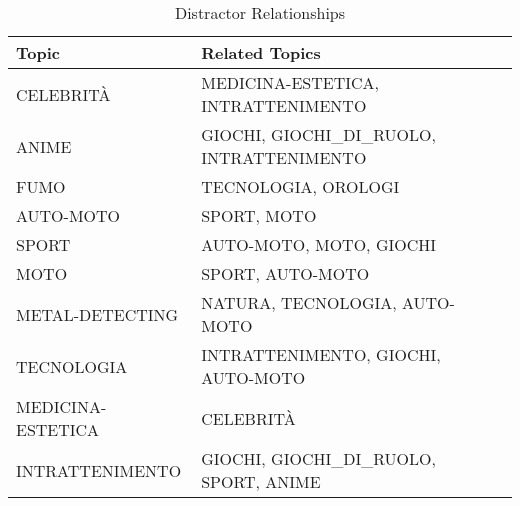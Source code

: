 \documentclass[11pt]{article}
\begin{document}
\begin{table*}
  \centering
  \caption{Distractor Relationships}
  \label{tab:distractor}
  \begin{tabular}{lll}
  \hline
  \textbf{Topic}           & \textbf{Related Topics}                                                                                                                         \\ \hline
  CELEBRITÀ                & MEDICINA-ESTETICA, INTRATTENIMENTO                                                                                                                   \\ \hline
  ANIME                    & GIOCHI, GIOCHI\_DI\_RUOLO, INTRATTENIMENTO                                                                                                           \\ \hline
  FUMO                     & TECNOLOGIA, OROLOGI                                                                                                                                  \\ \hline
  AUTO-MOTO                & SPORT, MOTO                                                                                                                                           \\ \hline
  SPORT                    & AUTO-MOTO, MOTO, GIOCHI                                                                                                                              \\ \hline
  MOTO                     & SPORT, AUTO-MOTO                                                                                                                                      \\ \hline
  METAL-DETECTING          & NATURA, TECNOLOGIA, AUTO-MOTO                                                                                                                         \\ \hline
  TECNOLOGIA               & INTRATTENIMENTO, GIOCHI, AUTO-MOTO                                                                                                                    \\ \hline
  MEDICINA-ESTETICA        & CELEBRITÀ                                                                                                                                             \\ \hline
  INTRATTENIMENTO          & GIOCHI, GIOCHI\_DI\_RUOLO, SPORT, ANIME                                                                                                               \\ \hline

\end{tabular}
\end{table*}
\end{document}
